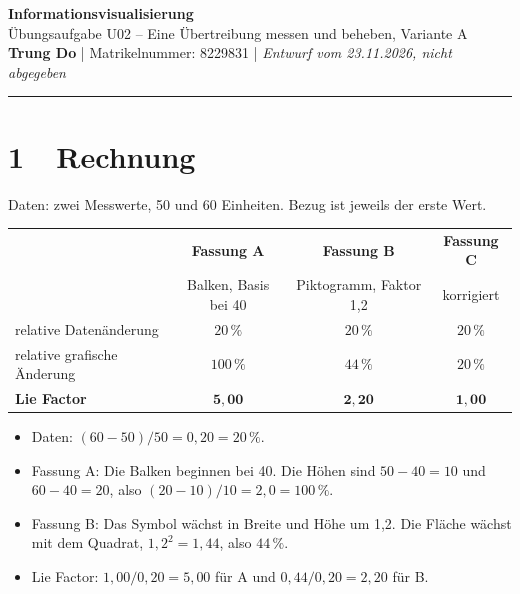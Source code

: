 \documentclass[a4paper,10pt]{article}
\begin{document}
\small

\begin{center}
\textbf{\large Informationsvisualisierung} \\
\small Übungsaufgabe U02 -- Eine Übertreibung messen und beheben, Variante A \\
\textbf{Trung Do} | Matrikelnummer: 8229831 | \textit{Entwurf vom 23.11.2026, nicht abgegeben}
\end{center}
\vspace{-3mm}
\noindent\rule{\textwidth}{0.3pt}

\section*{1\ \ Rechnung}

Daten: zwei Messwerte, 50 und 60 Einheiten. Bezug ist jeweils der erste Wert.

\begin{center}
\renewcommand{\arraystretch}{1.15}
\begin{tabular}{@{}lccc@{}}
\toprule
 & \textbf{Fassung A} & \textbf{Fassung B} & \textbf{Fassung C} \\
 & Balken, Basis bei 40 & Piktogramm, Faktor 1,2 & korrigiert \\
\midrule
relative Datenänderung & $20\,\%$ & $20\,\%$ & $20\,\%$ \\
relative grafische Änderung & $100\,\%$ & $44\,\%$ & $20\,\%$ \\
\textbf{Lie Factor} & $\mathbf{5{,}00}$ & $\mathbf{2{,}20}$ & $\mathbf{1{,}00}$ \\
\bottomrule
\end{tabular}
\end{center}

\begin{itemize}
\item Daten: $(60-50)/50 = 0{,}20 = 20\,\%$.
\item Fassung A: Die Balken beginnen bei 40. Die Höhen sind $50-40=10$ und $60-40=20$,
      also $(20-10)/10 = 2{,}0 = 100\,\%$.
\item Fassung B: Das Symbol wächst in Breite und Höhe um 1,2. Die Fläche wächst mit dem
      Quadrat, $1{,}2^2 = 1{,}44$, also $44\,\%$.
\item Lie Factor: $1{,}00/0{,}20 = 5{,}00$ für A und $0{,}44/0{,}20 = 2{,}20$ für B.
\end{itemize}
\end{document}
